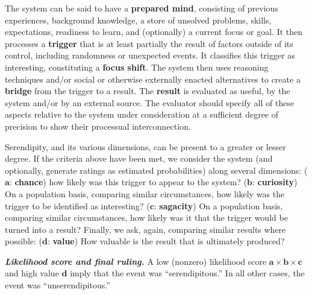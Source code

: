 \begin{description}[itemsep=16pt]
\item[{(\textbf{A - Definitional characteristics})}] {The system can
  be said to have a {\textbf{prepared mind}}, consisting of previous
  experiences, background knowledge, a store of unsolved problems,
  skills, expectations, readiness to learn, and (optionally) a current
  focus or goal.  It then processes a {\textbf{trigger}} that is at
  least partially the result of factors outside of its control,
  including randomness or unexpected events.  It classifies this
  trigger as interesting, constituting a {\textbf{focus shift}}.  The
  system then uses reasoning techniques and/or social or otherwise
  externally enacted alternatives to create a {\textbf{bridge}} from
  the trigger to a result.  The {\textbf{result}} is evaluated as
  useful, by the system and/or by an external source.}  The evaluator
  should specify all of these aspects relative to the system under
  consideration at a sufficient degree of precision to show their
  processual interconnection.
\item[{(\textbf{B - Dimensions})}] {Serendipity, and its various
  dimensions, can be present to a greater or lesser degree.  If the
  criteria above have been met, we consider the system (and
  optionally, generate ratings as estimated probabilities) along
  several dimensions:
%
{($\mathbf{a}$: \textbf{chance})} how likely was this trigger to appear to
  the system?
%
{($\mathbf{b}$: \textbf{curiosity})} On a population basis, comparing
similar circumstances, how likely was the trigger to be identified as
interesting?
%
{($\mathbf{c}$: \textbf{sagacity})} On a population basis, comparing
similar circumstances, how likely was it that the trigger would be
turned into a result?
%
Finally, we ask, again, comparing similar results where possible:
{($\mathbf{d}$: \textbf{value})} How valuable is the result that
is ultimately produced?}
%
\begin{mdframed}
\vspace{.1cm} {\textbf{\emph{Likelihood score and final ruling.}} A low (nonzero) likelihood score $\mathbf{a}\times\mathbf{b}\times\mathbf{c}$ and
  high value $\mathbf{d}$ imply that the event was ``serendipitous.''
  In all other cases, the event was ``unserendipitous.''}
\end{mdframed}

\end{description}
